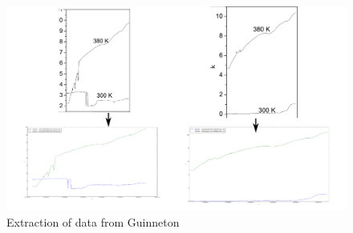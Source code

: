 %
\begin{figure}[h!] 
\centering 
\includegraphics[width=1.0\textwidth]{Figures/GuinnetonExtraction.png} 
\caption{Extraction of data from Guinneton}
\label{fig3E}
\end{figure}
%


\newpage
